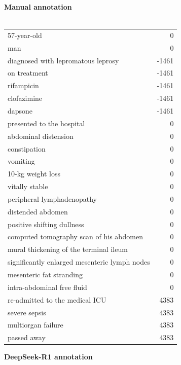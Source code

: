 \begin{figure}[t]
    \begin{minipage}[!htbp]{0.49\textwidth}
    \footnotesize
        \textbf{Manual annotation} \\ \\
        \footnotesize
        \begin{tabular}{P{0.75\textwidth}r}
            57-year-old&0 \\
            man&0 \\
            diagnosed with lepromatous leprosy&-1461 \\
            on treatment&-1461 \\
            rifampicin&-1461 \\
            clofazimine&-1461 \\
            dapsone&-1461 \\
            presented to the hospital&0 \\
            abdominal distension&0 \\
            constipation&0 \\
            vomiting&0 \\
            10-kg weight loss&0 \\
            vitally stable&0 \\
            peripheral lymphadenopathy&0 \\
            distended abdomen&0 \\
            positive shifting dullness&0 \\
            computed tomography scan of his abdomen&0 \\
            mural thickening of the terminal ileum&0 \\
            significantly enlarged mesenteric lymph nodes&0 \\
            mesenteric fat stranding&0 \\
            intra-abdominal free fluid&0 \\
            re-admitted to the medical ICU&4383 \\
            severe sepsis&4383 \\
            multiorgan failure&4383 \\
            passed away&4383
        \end{tabular}
    \end{minipage}
    \begin{minipage}[!htbp]{0.49\textwidth}
    \footnotesize
        \textbf{DeepSeek-R1 annotation} \\ \\

\end{minipage}
\end{figure}
